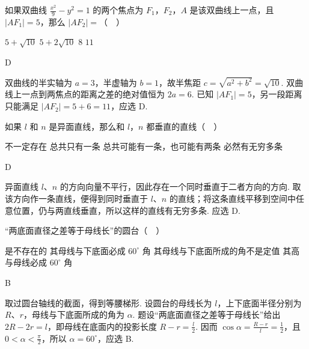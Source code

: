 \begin{problem}
如果双曲线 \(\frac{x^2}{9}-y^2=1\) 的两个焦点为 \(F_1\)，\(F_2\)，\(A\) 是该双曲线上一点，且 \(\left| AF_1 \right|=5\)，那么 \(\left| AF_2 \right|=\)（\(\quad\)）

\choices
    {\(5+\sqrt{10}\)}
    {\(5+2\sqrt{10}\)}
    {\(8\)}
    {\(11\)}
\end{problem}

\begin{answer}
D
\end{answer}

\begin{solution}
双曲线的半实轴为 \(a=3\)，半虚轴为 \(b=1\)，故半焦距 \(c=\sqrt{a^2+b^2}=\sqrt{10}\). 双曲线上一点到两焦点的距离之差的绝对值恒为 \(2a=6\). 已知 \(\lvert AF_1\rvert=5\)，另一段距离只能满足 \(\lvert AF_2\rvert=5+6=11\)，应选 D.
\end{solution}

\begin{problem}
如果 \(l\) 和 \(n\) 是异面直线，那么和 \(l\)，\(n\) 都垂直的直线（\(\quad\)）

\choices
    {不一定存在}
    {总共只有一条}
    {总共可能有一条，也可能有两条}
    {必然有无穷多条}
\end{problem}

\begin{answer}
D
\end{answer}

\begin{solution}
异面直线 \(l\)、\(n\) 的方向向量不平行，因此存在一个同时垂直于二者方向的方向. 取该方向作一条直线，便得到同时垂直于 \(l\)、\(n\) 的直线；将这条直线平移到空间中任意位置，仍与两直线垂直，所以这样的直线有无穷多条. 应选 D.
\end{solution}

\begin{problem}
“两底面直径之差等于母线长”的圆台（\(\quad\)）

\choices
    {是不存在的}
    {其母线与下底面必成 \(60^\circ\) 角}
    {其母线与下底面所成的角不是定值}
    {其高与母线必成 \(60^\circ\) 角}
\end{problem}

\begin{answer}
B
\end{answer}

\begin{solution}
取过圆台轴线的截面，得到等腰梯形. 设圆台的母线长为 \(l\)，上下底面半径分别为 \(R\)、\(r\)，母线与下底面所成的角为 \(\alpha\). 题设“两底面直径之差等于母线长”给出 \(2R-2r=l\)，即母线在底面内的投影长度 \(R-r=\frac l2\). 因而
\(\cos\alpha=\frac{R-r}{l}=\frac12\)，且 \(0<\alpha<\frac\pi2\)，所以 \(\alpha=60^\circ\)，应选 B.
\end{solution}

